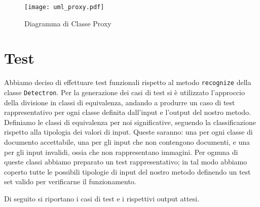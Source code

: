\documentclass[12pt,a4paper]{article}
\begin{document}
\begin{figure}[H]
    \caption{Diagramma di Classe Proxy}
    \centering
    \texttt{[image: uml\_proxy.pdf]}
\end{figure}

\section{Test}

Abbiamo deciso di effettuare test funzionali rispetto al metodo
\texttt{recognize} della classe \texttt{Detectron}. Per la generazione
dei casi di test si è utilizzato l'approccio della divisione in classi
di equivalenza, andando a produrre un caso di test rappresentativo per
ogni classe definita dall'input e l'output del nostro metodo. Definiamo
le classi di equivalenza per noi significative, seguendo la
classificazione rispetto alla tipologia dei valori di input. Queste
saranno: una per ogni classe di documento accettabile, una per gli input
che non contengono documenti, e una per gli input invalidi, ossia che
non rappresentano immagini. Per ognuna di queste classi abbiamo
preparato un test rappresentativo; in tal modo abbiamo coperto tutte le
possibili tipologie di input del nostro metodo definendo un test set
valido per verificarne il funzionamento.

Di seguito si riportano i casi di test e i rispettivi output attesi.

\end{document}
